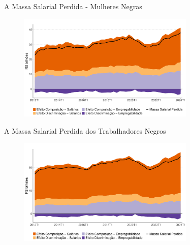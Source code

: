 \documentclass[10pt, xcolor=x11names,compress]{beamer}
\begin{document}
	\begin{frame}{A Massa Salarial Perdida - Mulheres Negras}
	\begin{figure}
		\centering
		\includegraphics[width = 0.75\textwidth]{figures_output/mulher_negra_massa_perdida_gph.pdf}
	\end{figure}
	\end{frame}		
	
	\begin{frame}{A Massa Salarial Perdida dos Trabalhadores Negros}
	\begin{figure}
		\centering
		\includegraphics[width = 0.75\textwidth]{figures_output/massa_perdida_gph.pdf}
	\end{figure}
	\end{frame}		
\end{document}
